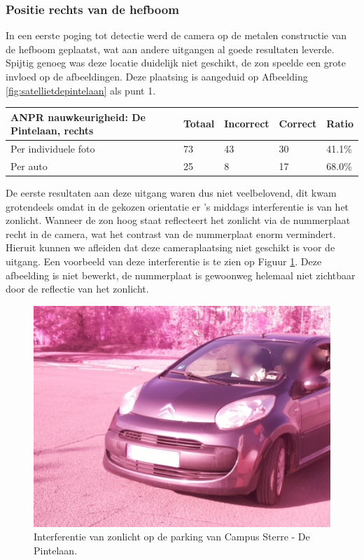 \subsubsection{Positie rechts van de hefboom}

In een eerste poging tot detectie werd de camera op de metalen constructie van de hefboom geplaatst, wat aan andere uitgangen al goede resultaten leverde. Spijtig genoeg was deze locatie duidelijk niet geschikt, de zon speelde een grote invloed op de afbeeldingen. Deze plaatsing is aangeduid op Afbeelding \ref{fig:satellietdepintelaan} als punt 1.

\begin{table}[h!]
	\centering
	\begin{tabular}{l|l|l|l|l}
		\textbf{ANPR nauwkeurigheid: De Pintelaan, rechts} & Totaal & Incorrect & Correct & Ratio	\\ \hline
		Per individuele foto 	& 73 & 43	& 30	& 41.1\%\\
		Per auto				& 25 & 8	& 17 	& 68.0\%\\
	\end{tabular}
\end{table}

De eerste resultaten aan deze uitgang waren dus niet veelbelovend, dit kwam grotendeels omdat in de gekozen orientatie er 's middags interferentie is van het zonlicht. Wanneer de zon hoog staat reflecteert het zonlicht via de nummerplaat recht in de camera, wat het contrast van de nummerplaat enorm vermindert. Hieruit kunnen we afleiden dat deze cameraplaatsing niet geschikt is voor de uitgang. Een voorbeeld van deze interferentie is te zien op Figuur \ref{SterreZonlicht}. Deze afbeelding is niet bewerkt, de nummerplaat is gewoonweg helemaal niet zichtbaar door de reflectie van het zonlicht.
\begin{figure}[h!]
	\centering
	\includegraphics[width=0.8\linewidth]{img/sterre2zon.jpg}
	\caption{Interferentie van zonlicht op de parking van Campus Sterre - De Pintelaan.}
	\label{SterreZonlicht}
\end{figure}

